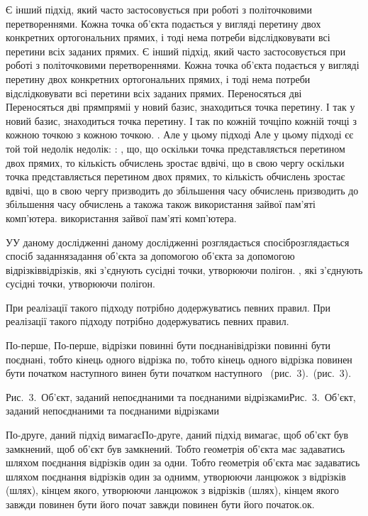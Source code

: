 \documentclass[12pt,a4paper]{article}
\begin{document}
\par
Є інший підхід, який часто застосовується при роботі з політочковими перетвореннями. Кожна точка об’єкта подається у вигляді перетину двох конкретних ортогональних прямих, і тоді нема потреби відслідковувати всі перетини всіх заданих прямих. Є інший підхід, який часто застосовується при роботі з політочковими перетвореннями. Кожна точка об’єкта подається у вигляді перетину двох конкретних ортогональних прямих, і тоді нема потреби відслідковувати всі перетини всіх заданих прямих. Переносяться дві Переносяться дві прямпряміі у новий базис, знаходиться точка перетину. І так  у новий базис, знаходиться точка перетину. І так по кожній точціпо кожній точці з кожною точкою з кожною точкою. . Але у цьому підході Але у цьому підході єє той той недолік недолік: : , що, що оскільки точка представляється перетином двох прямих, то кількість обчислень зростає вдвічі, що в свою чергу  оскільки точка представляється перетином двох прямих, то кількість обчислень зростає вдвічі, що в свою чергу призводить до збільшення часу обчислень призводить до збільшення часу обчислень а такожа також використання зайвої пам’яті комп’ютера.  використання зайвої пам’яті комп’ютера.
\par
УУ даному дослідженні  даному дослідженні розглядається спосіброзглядається спосіб  заданнязадання  об’єкта за допомогою об’єкта за допомогою відрізківвідрізків, які з’єднують сусідні точки, утворюючи полігон. , які з’єднують сусідні точки, утворюючи полігон.
\par
При реалізації такого підходу потрібно додержуватись певних правил. При реалізації такого підходу потрібно додержуватись певних правил.
\par
По-перше, По-перше, відрізки повинні бути поєднанівідрізки повинні бути поєднані, тобто кінець одного відрізка по, тобто кінець одного відрізка повинен бути початком наступного винен бути початком наступного  (рис. 3). (рис. 3).
\par
Рис. 3. Об’єкт, заданий непоєднаними та поєднаними відрізкамиРис. 3. Об’єкт, заданий непоєднаними та поєднаними відрізками
\par
По-друге, даний підхід вимагаєПо-друге, даний підхід вимагає, щоб об’єкт був замкнений, щоб об’єкт був замкнений. Тобто геометрія об’єкта має задаватись шляхом поєднання відрізків один за одни. Тобто геометрія об’єкта має задаватись шляхом поєднання відрізків один за однимм, утворюючи ланцюжок з відрізків (шлях), кінцем якого, утворюючи ланцюжок з відрізків (шлях), кінцем якого завжди повинен бути його почат завжди повинен бути його початок.ок.
\end{document}
